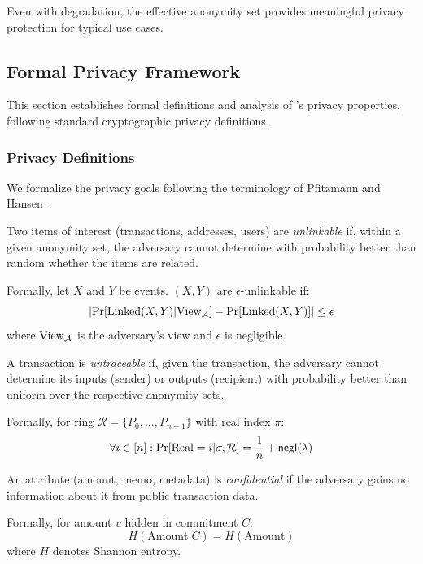 Even with degradation, the effective anonymity set provides meaningful
privacy protection for typical use cases.

\subsection{Formal Privacy Framework}
\label{sec:formal-privacy}

This section establishes formal definitions and analysis of \Botho's privacy
properties, following standard cryptographic privacy definitions.

\subsubsection{Privacy Definitions}

We formalize the privacy goals following the terminology of Pfitzmann and
Hansen~\cite{pfitzmann-hansen}.

\begin{definition}[Unlinkability]
Two items of interest (transactions, addresses, users) are \emph{unlinkable}
if, within a given anonymity set, the adversary cannot determine with
probability better than random whether the items are related.

Formally, let $X$ and $Y$ be events. $(X, Y)$ are $\epsilon$-unlinkable if:
\[
\left| \Pr[\text{Linked}(X, Y) | \text{View}_{\mathcal{A}}] - \Pr[\text{Linked}(X, Y)] \right| \leq \epsilon
\]
where $\text{View}_{\mathcal{A}}$ is the adversary's view and $\epsilon$ is negligible.
\end{definition}

\begin{definition}[Untraceability]
A transaction is \emph{untraceable} if, given the transaction, the adversary
cannot determine its inputs (sender) or outputs (recipient) with probability
better than uniform over the respective anonymity sets.

Formally, for ring $\mathcal{R} = \{P_0, \ldots, P_{n-1}\}$ with real index $\pi$:
\[
\forall i \in [n]: \Pr[\text{Real} = i | \sigma, \mathcal{R}] = \frac{1}{n} + \mathsf{negl}(\lambda)
\]
\end{definition}

\begin{definition}[Confidentiality]
An attribute (amount, memo, metadata) is \emph{confidential} if the adversary
gains no information about it from public transaction data.

Formally, for amount $v$ hidden in commitment $C$:
\[
H(\text{Amount} | C) = H(\text{Amount})
\]
where $H$ denotes Shannon entropy.
\end{definition}

